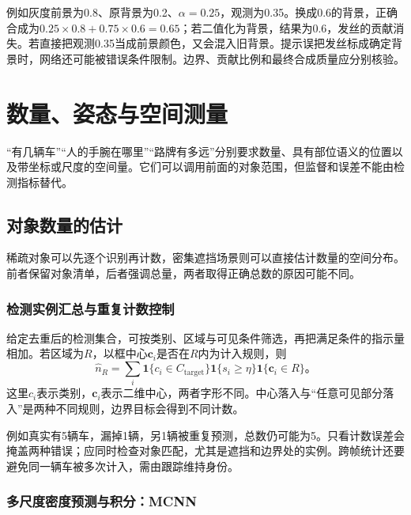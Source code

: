 例如灰度前景为0.8、原背景为0.2、$\alpha=0.25$，观测为0.35。换成0.6的背景，正确合成为$0.25\times0.8+0.75\times0.6=0.65$；若二值化为背景，结果为0.6，发丝的贡献消失。若直接把观测0.35当成前景颜色，又会混入旧背景。提示误把发丝标成确定背景时，网络还可能被错误条件限制。边界、贡献比例和最终合成质量应分别核验。

\section{数量、姿态与空间测量}
\label{sec:vision-recognition-measurement}

“有几辆车”“人的手腕在哪里”“路牌有多远”分别要求数量、具有部位语义的位置以及带坐标或尺度的空间量。它们可以调用前面的对象范围，但监督和误差不能由检测指标替代。

\subsection{对象数量的估计}
\label{sec:vision-recognition-counting}

稀疏对象可以先逐个识别再计数，密集遮挡场景则可以直接估计数量的空间分布。前者保留对象清单，后者强调总量，两者取得正确总数的原因可能不同。

\subsubsection{检测实例汇总与重复计数控制}
\label{sec:vision-recognition-instance-counting}

给定去重后的检测集合，可按类别、区域与可见条件筛选，再把满足条件的指示量相加。若区域为$R$，以框中心$\bm{c}_i$是否在$R$内为计入规则，则
\begin{equation}
 \hat n_R=\sum_i
 \mathbf{1}\{c_i\in C_{\mathrm{target}}\}
 \mathbf{1}\{s_i\geq\eta\}
 \mathbf{1}\{\bm{c}_i\in R\}\text{。}
 \label{eq:vision-detection-count}
\end{equation}
这里$c_i$表示类别，$\bm{c}_i$表示二维中心，两者字形不同。中心落入与“任意可见部分落入”是两种不同规则，边界目标会得到不同计数。

例如真实有5辆车，漏掉1辆，另1辆被重复预测，总数仍可能为5。只看计数误差会掩盖两种错误；应同时检查对象匹配，尤其是遮挡和边界处的实例。跨帧统计还要避免同一辆车被多次计入，需由跟踪维持身份。

\subsubsection{多尺度密度预测与积分：MCNN}
\label{sec:vision-recognition-mcnn}

